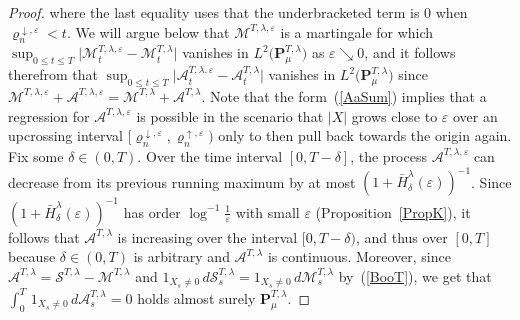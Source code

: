 \documentclass[10pt]{article}
\numberwithin{equation}{section}
\theoremstyle{definition}
\begin{document}
\begin{proof}
where the last equality uses that the underbracketed term is $0 $ when $\varrho_{n}^{\downarrow,\varepsilon}< t$.  We will  argue below that $\mathcal{M}^{T,\lambda,\varepsilon}$ is a martingale for which $\sup_{0\leq t\leq T}\big|\mathcal{M}^{T,\lambda,\varepsilon}_t  -\mathcal{M}^{T,\lambda}_t  \big|  $ vanishes in  $L^2\big( \mathbf{P}_{\mu}^{T,\lambda} \big)$ as $\varepsilon\searrow 0$, and  it follows therefrom that $\sup_{0\leq t\leq T}\big|\mathcal{A}^{T,\lambda,\varepsilon}_t  -\mathcal{A}^{T,\lambda}_t  \big|  $ vanishes in $L^2\big( \mathbf{P}_{\mu}^{T,\lambda} \big)$ since $\mathcal{M}^{T,\lambda,\varepsilon}+\mathcal{A}^{T,\lambda,\varepsilon}=\mathcal{M}^{T,\lambda}+\mathcal{A}^{T,\lambda}$. Note that  the form~(\ref{AaSum}) implies that a regression for $\mathcal{A}^{T,\lambda,\varepsilon}$  is possible in the scenario that $|X|$ grows close to $\varepsilon$ over an upcrossing interval $[ \varrho_{n}^{\downarrow,\varepsilon}, \varrho_{n}^{\uparrow,\varepsilon})$ only to then pull back towards the origin again.  Fix some $\delta\in (0,T)$.  Over the time interval $[0,T-\delta]$,  the process $\mathcal{A}^{T,\lambda,\varepsilon}$ can decrease from its previous running maximum by at most $ (1+\bar{H}_\delta^{\lambda}(\varepsilon))^{-1}$.    Since $ (1+\bar{H}_\delta^{\lambda}(\varepsilon))^{-1}$ has order $\log^{-1}\frac{1}{\varepsilon}  $ with small $\varepsilon$ (Proposition~\ref{PropK}),  it follows that  $\mathcal{A}^{T,\lambda}$ is increasing over the interval $[0,T-\delta)$, and thus over $[0,T]$ because $\delta\in (0,T)$ is arbitrary and  $\mathcal{A}^{T,\lambda}$ is continuous.  Moreover, since $\mathcal{A}^{T,\lambda}=\mathcal{S}^{T,\lambda}-\mathcal{M}^{T,\lambda}$
and $1_{X_s\neq 0}\,d\mathcal{S}^{T,\lambda}_s =1_{X_s\neq 0}\,d\mathcal{M}^{T,\lambda}_s$  by~(\ref{BooT}), we get that $  \int_0^T\,  1_{X_s\neq 0}\,  d\mathcal{A}^{T,\lambda}_s=0$ holds almost surely $\mathbf{P}^{T,\lambda}_{\mu}$.




\end{proof}
\end{document}
